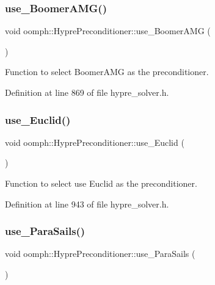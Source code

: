 \subsubsection{\texorpdfstring{use\+\_\+\+Boomer\+A\+M\+G()}{use\_BoomerAMG()}}
{\footnotesize\ttfamily void oomph\+::\+Hypre\+Preconditioner\+::use\+\_\+\+Boomer\+A\+MG (\begin{DoxyParamCaption}{ }\end{DoxyParamCaption})\hspace{0.3cm}{\ttfamily [inline]}}



Function to select Boomer\+A\+MG as the preconditioner. 



Definition at line 869 of file hypre\+\_\+solver.\+h.

\mbox{\label{classoomph_1_1HyprePreconditioner_a8250d689c9788cbe028655fc7630aee9}} 
\subsubsection{\texorpdfstring{use\+\_\+\+Euclid()}{use\_Euclid()}}
{\footnotesize\ttfamily void oomph\+::\+Hypre\+Preconditioner\+::use\+\_\+\+Euclid (\begin{DoxyParamCaption}{ }\end{DoxyParamCaption})\hspace{0.3cm}{\ttfamily [inline]}}



Function to select use Euclid as the preconditioner. 



Definition at line 943 of file hypre\+\_\+solver.\+h.

\mbox{\label{classoomph_1_1HyprePreconditioner_aacffb2fc026a5d1c4ead91b49e8002ae}} 
\subsubsection{\texorpdfstring{use\+\_\+\+Para\+Sails()}{use\_ParaSails()}}
{\footnotesize\ttfamily void oomph\+::\+Hypre\+Preconditioner\+::use\+\_\+\+Para\+Sails (\begin{DoxyParamCaption}{ }\end{DoxyParamCaption})\hspace{0.3cm}{\ttfamily [inline]}}



